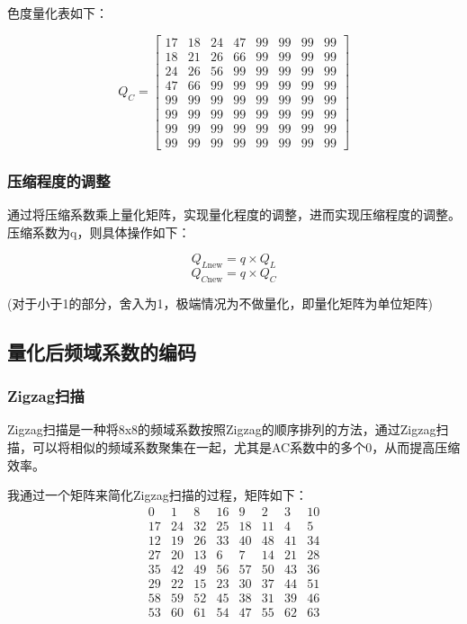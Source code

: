 \documentclass{article}
\begin{document}
色度量化表如下：

$$
Q_C=\begin{bmatrix}
17 & 18 & 24 & 47 & 99 & 99 & 99 & 99 \\
18 & 21 & 26 & 66 & 99 & 99 & 99 & 99 \\
24 & 26 & 56 & 99 & 99 & 99 & 99 & 99 \\
47 & 66 & 99 & 99 & 99 & 99 & 99 & 99 \\
99 & 99 & 99 & 99 & 99 & 99 & 99 & 99 \\
99 & 99 & 99 & 99 & 99 & 99 & 99 & 99 \\
99 & 99 & 99 & 99 & 99 & 99 & 99 & 99 \\
99 & 99 & 99 & 99 & 99 & 99 & 99 & 99
\end{bmatrix}
$$


\subsubsection{压缩程度的调整}

通过将压缩系数乘上量化矩阵，实现量化程度的调整，进而实现压缩程度的调整。压缩系数为q，则具体操作如下：

$$
Q_{L\text{new}} = q\times Q_L
$$
$$
Q_{C\text{new}} = q\times Q_C
$$

\begin{center}
    (对于小于1的部分，舍入为1，极端情况为不做量化，即量化矩阵为单位矩阵)
\end{center}

\subsection{量化后频域系数的编码}

\subsubsection{Zigzag扫描}

Zigzag扫描是一种将8x8的频域系数按照Zigzag的顺序排列的方法，通过Zigzag扫描，可以将相似的频域系数聚集在一起，尤其是AC系数中的多个0，从而提高压缩效率。

我通过一个矩阵来简化Zigzag扫描的过程，矩阵如下：
\[
\begin{matrix}
0 & 1 & 8 & 16 & 9 & 2 & 3 & 10 \\
17 & 24 & 32 & 25 & 18 & 11 & 4 & 5 \\
12 & 19 & 26 & 33 & 40 & 48 & 41 & 34 \\
27 & 20 & 13 & 6 & 7 & 14 & 21 & 28 \\
35 & 42 & 49 & 56 & 57 & 50 & 43 & 36 \\
29 & 22 & 15 & 23 & 30 & 37 & 44 & 51 \\
58 & 59 & 52 & 45 & 38 & 31 & 39 & 46 \\
53 & 60 & 61 & 54 & 47 & 55 & 62 & 63 \\
\end{matrix}
\]
\end{document}
